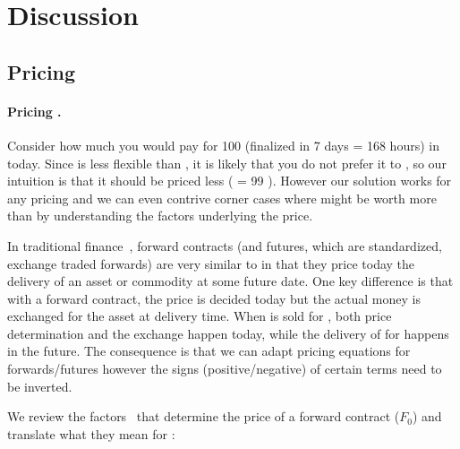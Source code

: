 
\section{Discussion}

\subsection{Pricing}  
\label{sec:pricing}

\paragraph{Pricing \ethxx.}

Consider how much you would pay for 100 \ethxx (finalized in 7 days = 168 hours) in \ethone today. Since \ethxx is less flexible than \ethone, it is likely that you do not prefer it to \ethone, so our intuition is that it should be priced less ( \ethxx = 99 \ethone). However our solution works for any pricing and we can even contrive corner cases where \ethxx might be worth more than \ethone by understanding the factors underlying the price. 

In traditional finance~\cite{Hull}, forward contracts (and futures, which are standardized, exchange traded forwards) are very similar to \ethxx in that they price today the delivery of an asset or commodity at some future date. One key difference is that with a forward contract, the price is decided today but the actual money is exchanged for the asset at delivery time. When \ethxx is sold for \ethone, both price determination and the exchange happen today, while the delivery of \ethone for \ethxx happens in the future. The consequence is that we can adapt pricing equations for forwards/futures however the signs (positive/negative) of certain terms need to be inverted. 

We review the factors~\cite{Hull} that determine the price of a forward contract ($F_0$) and translate what they mean for \ethxx:

